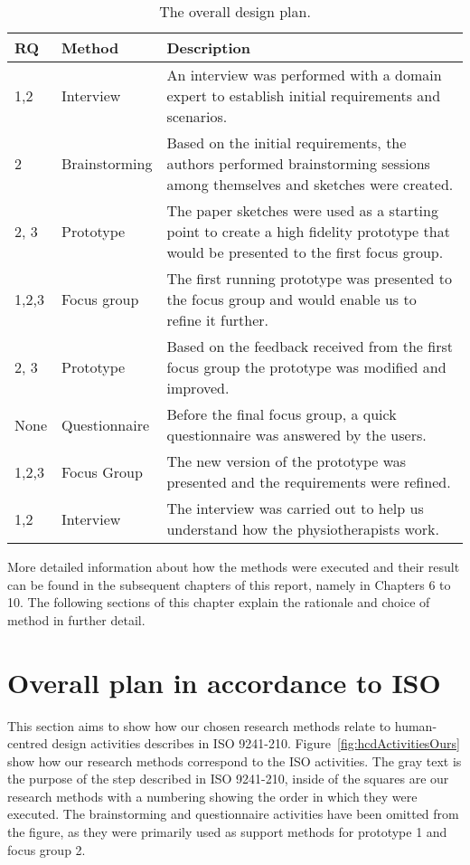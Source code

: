 \begin{table}[h!]
  \centering
  \begin{tabular}{|p{0.7cm}|p{2.2cm}|p{8.8cm}|}
    \hline
    \textbf{RQ} & \textbf{Method} & \textbf{Description} \\ \hline
    1,2 & Interview & An interview was performed with a domain expert to establish initial requirements and scenarios. \\ \hline
    2 & Brainstorming & Based on the initial requirements, the authors performed brainstorming sessions among themselves and sketches were created. \\ \hline
    2, 3 & Prototype & The paper sketches were used as a starting point to create a high fidelity prototype that would be presented to the first focus group. \\ \hline
    1,2,3 & Focus group & The first running prototype was presented to the focus group and would enable us to refine it further. \\ \hline
    2, 3 & Prototype & Based on the feedback received from the first focus group the prototype was modified and improved. \\ \hline
    None & Questionnaire & Before the final focus group, a quick questionnaire was answered by the users. \\ \hline
    1,2,3 & Focus Group & The new version of the prototype was presented and the requirements were refined. \\ \hline
    1,2 & Interview & The interview was carried out to help us understand how the physiotherapists work. \\ \hline
  \end{tabular}
  \caption{The overall design plan.}
  \label{tab:designPlan}
\end{table}

More detailed information about how the methods were executed and their result can be found in the subsequent chapters of this report, namely in Chapters 6 to 10. The following sections of this chapter explain the rationale and choice of method in further detail.
 
\section{Overall plan in accordance to ISO}
This section aims to show how our chosen research methods relate to human-centred design activities describes in ISO 9241-210. Figure~\ref{fig:hcdActivitiesOurs} show how our research methods correspond to the ISO activities. The gray text is the purpose of the step described in ISO 9241-210, inside of the squares are our research methods with a numbering showing the order in which they were executed. The brainstorming and questionnaire activities have been omitted from the figure, as they were primarily used as support methods for prototype 1 and focus group 2.

